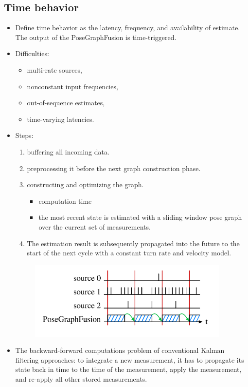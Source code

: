 \documentclass[letterpaper,10pt]{article}
\begin{document}
\subsection{Time behavior}

\begin{itemize}
	\item Define time behavior as the latency, frequency, and availability of estimate. The output of the PoseGraphFusion is time-triggered.
	\item Difficulties:
	\begin{itemize}
		\item multi-rate sources,
		\item nonconstant input frequencies,
		\item out-of-sequence estimates,
		\item time-varying latencies.
	\end{itemize}
	\item Steps:
	\begin{enumerate}
		\item buffering all incoming data.
		\item preprocessing it before the next graph construction phase.
		\item constructing and optimizing the graph.
		\begin{itemize}
			\item computation time
			\item the most recent state is estimated with a sliding window pose graph over the current set of measurements.
		\end{itemize}
		\item The estimation result is subsequently propagated into the future to the start of the next cycle with a constant turn rate and velocity model.
	\end{enumerate}
	\begin{figure}[!ht]
		\centering
		\includegraphics[width=10cm]{./img/timebehavior.png}
	\end{figure}
	\item The backward-forward computations problem of conventional Kalman filtering approaches: to integrate a new measurement, it has to propagate its state back in time to the time of the measurement, apply the measurement, and re-apply all other stored measurements.
\end{itemize}
\end{document}
